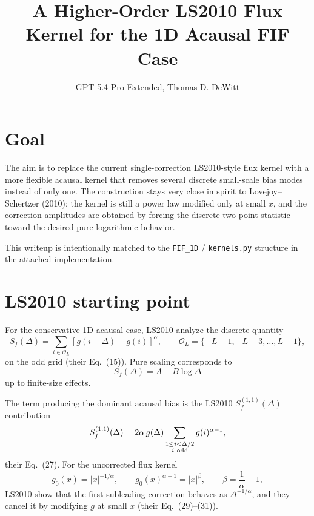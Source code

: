 \documentclass[11pt]{article}
\title{A Higher-Order LS2010 Flux Kernel for the 1D Acausal FIF Case}
\author{GPT-5.4 Pro Extended, Thomas D. DeWitt}
\date{}
\begin{document}
\maketitle

\section{Goal}

The aim is to replace the current single-correction LS2010-style flux kernel with a
more flexible acausal kernel that removes several discrete small-scale bias modes
instead of only one.  The construction stays very close in spirit to
Lovejoy--Schertzer (2010): the kernel is still a power law modified only at small
$x$, and the correction amplitudes are obtained by forcing the discrete
two-point statistic toward the desired pure logarithmic behavior.

This writeup is intentionally matched to the \texttt{FIF\_1D} / \texttt{kernels.py}
structure in the attached implementation.

\section{LS2010 starting point}

For the conservative 1D acausal case, LS2010 analyze the discrete quantity
\begin{equation}
S_f(\Delta)
=
\sum_{i \in \mathcal O_L}
\left[g(i-\Delta)+g(i)\right]^\alpha,
\qquad
\mathcal O_L = \{-L+1,-L+3,\dots,L-1\},
\end{equation}
on the odd grid (their Eq.~(15)).  Pure scaling corresponds to
\begin{equation}
S_f(\Delta)=A + B \log \Delta
\end{equation}
up to finite-size effects.

The term producing the dominant acausal bias is the LS2010
\(
S_f^{(1,1)}(\Delta)
\)
contribution
\begin{equation}
S_f^{(1,1)}(\Delta)
=
2\alpha\, g(\Delta)
\sum_{\substack{1 \le i < \Delta/2 \\ i\ {\rm odd}}}
g(i)^{\alpha-1},
\end{equation}
their Eq.~(27).  For the uncorrected flux kernel
\begin{equation}
g_0(x)=|x|^{-1/\alpha},
\qquad
g_0(x)^{\alpha-1}=|x|^{\beta},
\qquad
\beta=\frac{1}{\alpha}-1,
\end{equation}
LS2010 show that the first subleading correction behaves as
\(
\Delta^{-1/\alpha}
\),
and they cancel it by modifying $g$ at small $x$ (their Eq.~(29)--(31)).
\end{document}
